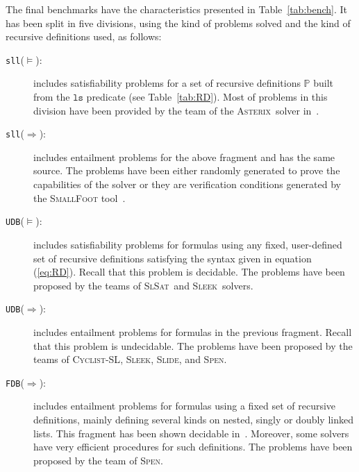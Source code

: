 \documentclass{llncs}
\newcommand{\limp}{\Rightarrow}
\newcommand{\preds}{\mathbb{P}}
\newcommand{\ls}{\mathtt{ls}}
\newcommand{\sllsat}{\texttt{sll}($\models$)}
\newcommand{\sllent}{\texttt{sll}($\limp$)}
\newcommand{\FDBent}{\texttt{FDB}($\limp$)}
\newcommand{\UDBsat}{\texttt{UDB}($\models$)}
\newcommand{\UDBent}{\texttt{UDB}($\limp$)}
\newcommand{\ASTERIX}{\textsc{Asterix}}
\newcommand{\CYCLIST}{\textsc{Cyclist-SL}}
\newcommand{\SLEEK}{\textsc{Sleek}}
\newcommand{\SLIDE}{\textsc{Slide}}
\newcommand{\SLSAT}{\textsc{SlSat}}
\newcommand{\SPEN}{\textsc{Spen}}
\begin{document}
The final benchmarks have the characteristics presented in Table~\ref{tab:bench}.
It has been split in five divisions, using the kind of problems solved and the kind of recursive definitions used, as follows:
\begin{description}
\item[\sllsat:] includes satisfiability problems for a set of recursive definitions $\preds$ built from the $\ls$ predicate (see Table~\ref{tab:RD}).
Most of problems in this division have been provided by the team of the \ASTERIX\ solver in~\cite{PerezR11}.

\item[\sllent:] includes entailment problems for the above fragment and has the same source. The problems have been either randomly generated to prove the capabilities of  the solver or they are verification conditions generated by the \textsc{SmallFoot} tool~\cite{SmallFootsite}.

\item[\UDBsat:] includes satisfiability problems for formulas using any fixed, user-defined set of recursive definitions satisfying the syntax given in equation (\ref{eq:RD}).
Recall that this problem is decidable. 
The problems have been proposed by the teams of \SLSAT\ and \SLEEK\ solvers.

\item[\UDBent:] includes entailment problems for formulas in the previous fragment.
Recall that this problem is undecidable. 
The problems have been proposed by the teams of \CYCLIST, \SLEEK, \SLIDE, and \SPEN.

\item[\FDBent:] includes entailment problems for formulas using a fixed set of recursive definitions, mainly defining several kinds on nested, singly or doubly linked lists. This fragment has been shown decidable in~\cite{AntonopoulosGHKO14,EneaLSV14}.
Moreover, some solvers have very efficient procedures for such definitions.
The problems have been proposed by the team of \SPEN.
\end{description} 
 
\end{document}
